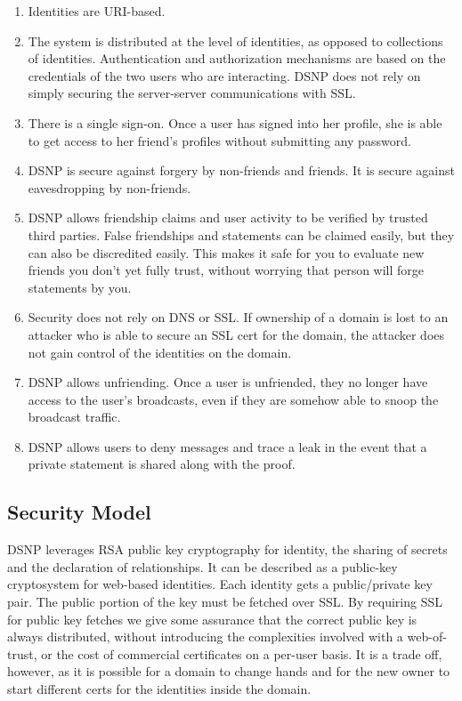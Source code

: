 \documentclass[letterpaper,11pt,oneside]{article}
\begin{document}
\begin{enumerate}

\item Identities are URI-based.

\item The system is distributed at the level of identities, as opposed to
collections of identities. Authentication and authorization mechanisms are
based on the credentials of the two users who are interacting. DSNP does not
rely on simply securing the server-server communications with SSL.

\item There is a single sign-on. Once a user has signed into her profile, she
is able to get access to her friend's profiles without submitting any password.

\item DSNP is secure against forgery by non-friends and friends. It is secure
against eavesdropping by non-friends.

\item DSNP allows friendship claims and user activity to be verified by trusted
third parties. False friendships and statements can be claimed easily, but they
can also be discredited easily. This makes it safe for you to evaluate new
friends you don't yet fully trust, without worrying that person will forge
statements by you.

\item Security does not rely on DNS or SSL. If ownership of a domain is lost to
an attacker who is able to secure an SSL cert for the domain, the attacker does
not gain control of the identities on the domain.

\item DSNP allows unfriending. Once a user is unfriended, they no longer have
access to the user's broadcasts, even if they are somehow able to snoop the
broadcast traffic.

\item DSNP allows users to deny messages and trace a leak in the event that a
private statement is shared along with the proof.

\end{enumerate}

\subsection{Security Model}

DSNP leverages RSA public key cryptography for identity, the sharing of secrets
and the declaration of relationships. It can be described as a public-key
cryptosystem for web-based identities. Each identity gets a public/private key
pair. The public portion of the key must be fetched over SSL. By requiring SSL
for public key fetches we give some assurance that the correct public key is
always distributed, without introducing the complexities involved with a
web-of-trust, or the cost of commercial certificates on a per-user basis. It is
a trade off, however, as it is possible for a domain to change hands and for
the new owner to start different certs for the identities inside the domain.
\end{document}
